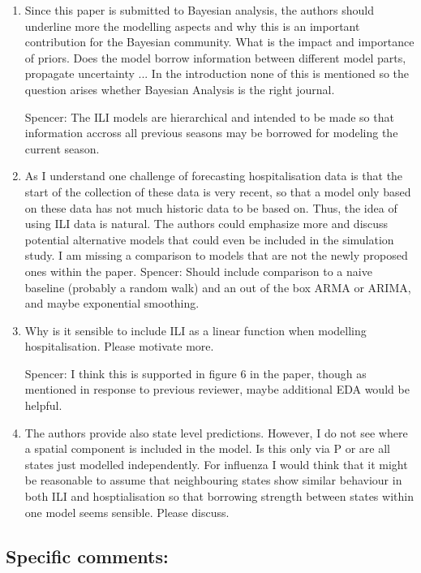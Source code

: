 \documentclass{article}
\newcommand{\spencer}[1]{{\color{blue} Spencer: #1}}
\begin{document}
\begin{enumerate}[1.]

\item Since this paper is submitted to Bayesian analysis, the authors should 
underline more the modelling aspects and why this is an important contribution 
for the Bayesian community. What is the impact and importance of priors. Does 
the model borrow information between different model parts, propagate 
uncertainty ... In the introduction none of this is mentioned so the question 
arises whether Bayesian Analysis is the right journal.

\spencer{The ILI models are hierarchical and intended to be made so that information
accross all previous seasons may be borrowed for modeling the current season.}

\item As I understand one challenge of forecasting hospitalisation data is that the 
start of the collection of these data is very recent, so that a model only 
based on these data has not much historic data to be based on. Thus, the idea 
of using ILI data is natural. The authors could emphasize more and discuss 
potential alternative models that could even be included in the simulation 
study. I am missing a comparison to models that are not the newly proposed 
ones within the paper.
\spencer{Should include comparison to a naive baseline (probably a random walk) 
and an out of the box ARMA or ARIMA, and maybe exponential smoothing.}

\item Why is it sensible to include ILI as a linear function when modelling 
hospitalisation. Please motivate more. 

\spencer{I think this is supported in figure 6 in the paper, though as mentioned 
in response to previous reviewer, maybe additional EDA would be helpful.}

\item The authors provide also state level predictions. However, I do not see 
where a spatial component is included in the model. Is this only via P or are 
all states just modelled independently. For influenza I would think that it 
might be reasonable to assume that neighbouring states show similar behaviour 
in both ILI and hosptialisation so that borrowing strength between states 
within one model seems sensible. Please discuss.

\end{enumerate}


\subsection*{Specific comments:}
\end{document}
